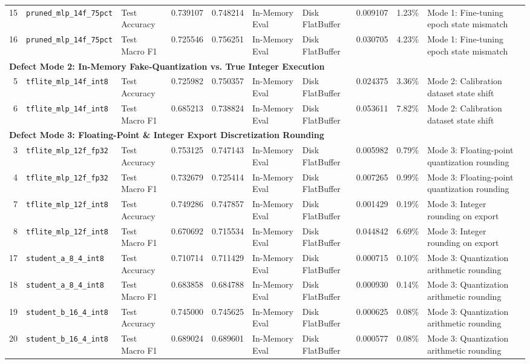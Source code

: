 \documentclass[journal]{IEEEtran}
\begin{document}
\begin{table}[t]
{\begin{tabular}{r l l r r l l r r p{4.8cm}}
15 & \texttt{pruned\_mlp\_14f\_75pct} & Test Accuracy & 0.739107 & 0.748214 & In-Memory Eval & Disk FlatBuffer & 0.009107 & 1.23\% & Mode 1: Fine-tuning epoch state mismatch \\
16 & \texttt{pruned\_mlp\_14f\_75pct} & Test Macro F1 & 0.725546 & 0.756251 & In-Memory Eval & Disk FlatBuffer & 0.030705 & 4.23\% & Mode 1: Fine-tuning epoch state mismatch \\
\midrule
\multicolumn{10}{l}{\textbf{Defect Mode 2: In-Memory Fake-Quantization vs. True Integer Execution}} \\
5 & \texttt{tflite\_mlp\_14f\_int8} & Test Accuracy & 0.725982 & 0.750357 & In-Memory Eval & Disk FlatBuffer & 0.024375 & 3.36\% & Mode 2: Calibration dataset state shift \\
6 & \texttt{tflite\_mlp\_14f\_int8} & Test Macro F1 & 0.685213 & 0.738824 & In-Memory Eval & Disk FlatBuffer & 0.053611 & 7.82\% & Mode 2: Calibration dataset state shift \\
\midrule
\multicolumn{10}{l}{\textbf{Defect Mode 3: Floating-Point \& Integer Export Discretization Rounding}} \\
3 & \texttt{tflite\_mlp\_12f\_fp32} & Test Accuracy & 0.753125 & 0.747143 & In-Memory Eval & Disk FlatBuffer & 0.005982 & 0.79\% & Mode 3: Floating-point quantization rounding \\
4 & \texttt{tflite\_mlp\_12f\_fp32} & Test Macro F1 & 0.732679 & 0.725414 & In-Memory Eval & Disk FlatBuffer & 0.007265 & 0.99\% & Mode 3: Floating-point quantization rounding \\
7 & \texttt{tflite\_mlp\_12f\_int8} & Test Accuracy & 0.749286 & 0.747857 & In-Memory Eval & Disk FlatBuffer & 0.001429 & 0.19\% & Mode 3: Integer rounding on export \\
8 & \texttt{tflite\_mlp\_12f\_int8} & Test Macro F1 & 0.670692 & 0.715534 & In-Memory Eval & Disk FlatBuffer & 0.044842 & 6.69\% & Mode 3: Integer rounding on export \\
17 & \texttt{student\_a\_8\_4\_int8} & Test Accuracy & 0.710714 & 0.711429 & In-Memory Eval & Disk FlatBuffer & 0.000715 & 0.10\% & Mode 3: Quantization arithmetic rounding \\
18 & \texttt{student\_a\_8\_4\_int8} & Test Macro F1 & 0.683858 & 0.684788 & In-Memory Eval & Disk FlatBuffer & 0.000930 & 0.14\% & Mode 3: Quantization arithmetic rounding \\
19 & \texttt{student\_b\_16\_4\_int8} & Test Accuracy & 0.745000 & 0.745625 & In-Memory Eval & Disk FlatBuffer & 0.000625 & 0.08\% & Mode 3: Quantization arithmetic rounding \\
20 & \texttt{student\_b\_16\_4\_int8} & Test Macro F1 & 0.689024 & 0.689601 & In-Memory Eval & Disk FlatBuffer & 0.000577 & 0.08\% & Mode 3: Quantization arithmetic rounding \\
\bottomrule
\end{tabular}%
}
\end{table}
\end{document}
